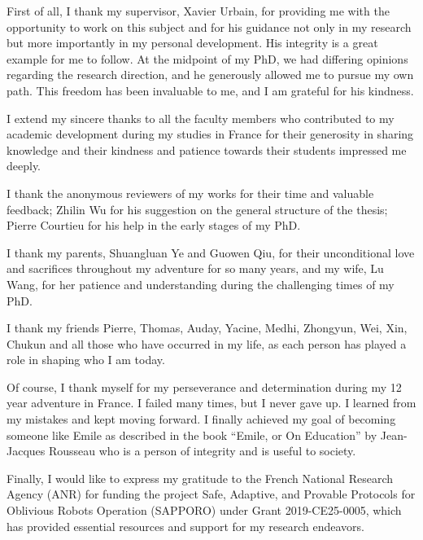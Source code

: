 

First of all, I thank my supervisor, Xavier Urbain, for providing me with the opportunity to work on this subject and for
 his guidance not only in my research but more importantly in my personal development. His integrity is a great example for me to follow. At the midpoint of my PhD, we had differing opinions regarding the research direction, and he generously allowed me to pursue my own path. This freedom has been invaluable to me, and I am grateful for his kindness.

I extend my sincere thanks to all the faculty members who contributed to my academic development during my studies in France for their generosity in sharing knowledge and their kindness and patience towards their students impressed me deeply.

I thank the anonymous reviewers of my works for their time and valuable feedback; Zhilin Wu for his suggestion on the general structure of the thesis; Pierre Courtieu for his help in the early stages of my PhD.

I thank my parents, Shuangluan Ye and Guowen Qiu, for their unconditional love and sacrifices throughout my adventure for so many years, and my wife, Lu Wang, for her patience and understanding during the challenging times of my PhD.

I thank my friends Pierre, Thomas, Auday, Yacine, Medhi, Zhongyun, Wei, Xin, Chukun and all those who have occurred in my life, as each person has played a role in shaping who I am today. 

Of course, I thank myself for my perseverance and determination during my 12 year adventure in France. I failed many times, but I never gave up. I learned from my mistakes and kept moving forward. I finally achieved my goal of becoming someone like Emile as described in the book \enquote{Emile, or On Education} by Jean-Jacques Rousseau who is a person of integrity and is useful to society.

Finally, I would like to express my gratitude to the French National Research Agency (ANR) for funding the project Safe, Adaptive, and Provable Protocols for Oblivious Robots Operation (SAPPORO) under Grant 2019-CE25-0005, which has provided essential resources and support for my research endeavors.  
